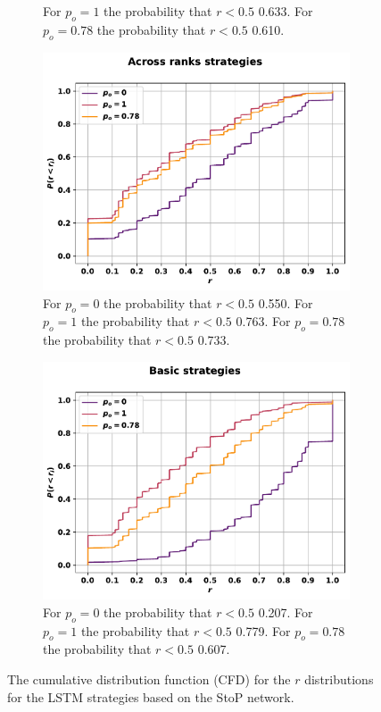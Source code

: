 \begin{figure}[!htbp]
\begin{subfigure}{.45\textwidth}
{    For \(p_o=1\) the probability that \(r<0.5\) 0.633.
    For \(p_o=0.78\) the probability that \(r<0.5\) 0.610.}
    \end{subfigure}
    \begin{subfigure}{.45\textwidth}
    \includegraphics[width=\textwidth]{src/chapters/07/img/cfd_to_probability_across_ranks_strategies.pdf}
    \caption{For \(p_o=0\) the probability that \(r<0.5\) 0.550.
    For \(p_o=1\) the probability that \(r<0.5\) 0.763.
    For \(p_o=0.78\) the probability that \(r<0.5\) 0.733.}
    \end{subfigure}\hfill
    \begin{subfigure}{.45\textwidth}
    \includegraphics[width=\textwidth]{src/chapters/07/img/cfd_to_probability_basic_strategies.pdf}
    \caption{For \(p_o=0\) the probability that \(r<0.5\) 0.207.
    For \(p_o=1\) the probability that \(r<0.5\) 0.779.
    For \(p_o=0.78\) the probability that \(r<0.5\) 0.607.}
    \end{subfigure}
    \caption{The cumulative distribution function (CFD)
    for the \(r\) distributions for the LSTM strategies based on the StoP
    network.}\label{fig:cfd_s_to_p}
\end{figure}

